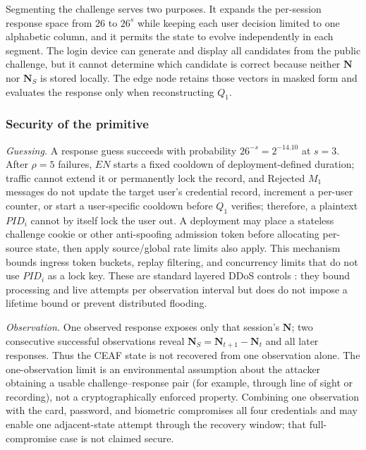 \documentclass[cmc,article,submit,moreauthors,pdftex]{Definitions/tsp}
\providecommand{\DIFadd}[1]{{\protect\color{blue} \sf #1}} %
\providecommand{\DIFdel}[1]{{\protect\color{red} \scriptsize #1}} %
\providecommand{\DIFaddbegin}{} %
\providecommand{\DIFaddend}{} %
\providecommand{\DIFdelbegin}{} %
\providecommand{\DIFdelend}{} %
\begin{document}
Segmenting the challenge serves two purposes. It expands the per-session response space from $26$ to $26^s$ while keeping each user decision limited to one alphabetic column, and it permits the state to evolve independently in each segment. The login device can generate and display all candidates from the public challenge, but it cannot determine which candidate is correct because neither $\mathbf{N}$ nor $\mathbf{N}_S$ is stored locally. The edge node retains those vectors in masked form and evaluates the response only when reconstructing $Q_1$.

\subsubsection{Security of the primitive}\label{sec:ceafsec}

\emph{Guessing.} A response guess succeeds with probability $26^{-s}=2^{-14.10}$ at $s=3$. \DIFdelbegin \DIFdel{After $\rho=5$ failures, $EN$ starts a fixed cooldown of deployment-defined duration; traffic cannot extend it or permanently lock the record, and }\DIFdelend \DIFaddbegin \DIFadd{Rejected $M_1$ messages do not update the target user's credential record, increment a per-user counter, or start a user-specific cooldown before $Q_1$ verifies; therefore, a plaintext $PID_i$ cannot by itself lock the user out. A deployment may place a stateless challenge cookie or other anti-spoofing admission token before allocating per-source state, then apply }\DIFaddend source/global \DIFdelbegin \DIFdel{rate limits also apply. This mechanism bounds }\DIFdelend \DIFaddbegin \DIFadd{ingress token buckets, replay filtering, and concurrency limits that do not use $PID_i$ as a lock key. These are standard layered DDoS controls \cite{mirkovic2004taxonomy}: they bound processing and live }\DIFaddend attempts per observation interval but \DIFdelbegin \DIFdel{does }\DIFdelend \DIFaddbegin \DIFadd{do }\DIFaddend not impose a lifetime bound \DIFaddbegin \DIFadd{or prevent distributed flooding}\DIFaddend .

\emph{Observation.} One observed response exposes only that session's $\mathbf{N}$; two consecutive successful observations reveal $\mathbf{N}_S=\mathbf{N}_{t+1}-\mathbf{N}_t$ and all later responses. Thus the CEAF state is not recovered from one observation alone. \DIFaddbegin \DIFadd{The one-observation limit is an environmental assumption about the attacker obtaining a usable challenge--response pair (for example, through line of sight or recording), not a cryptographically enforced property. }\DIFaddend Combining one observation with the card, password, and biometric compromises all four credentials and may enable one adjacent-state attempt through the recovery window; that full-compromise case is not claimed secure.
\end{document}
